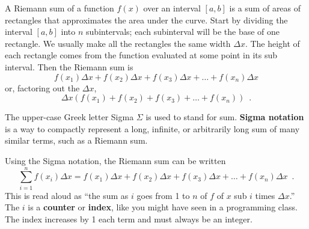 \begin{definition}
A Riemann sum of a function $f(x)$ over an interval $[a,b]$ is a sum of areas of rectangles that approximates the area under the curve. Start by dividing the interval $[a,b]$ into $n$ subintervals; each subinterval will be the base of one rectangle. We usually make all the rectangles the same width $\Delta x$. The height of each rectangle comes from the function evaluated at some point in its sub interval. Then the Riemann sum is
$$f(x_1)\Delta x + f(x_2)\Delta x+f(x_3)\Delta x + \ldots +f(x_n)\Delta x$$
or, factoring out the $\Delta x$,
$$\Delta x(f(x_1)+f(x_2)+f(x_3)+\ldots +f(x_n)) \enspace .$$
\end{definition}
\begin{definition}
The upper-case Greek letter Sigma $\Sigma$ is used to stand for sum. {\bf Sigma notation} is a way to compactly represent a long, infinite, or arbitrarily long sum of many similar terms, such as a Riemann sum.

Using the Sigma notation, the Riemann sum can be written
$$\sum_{i=1}^n f(x_i)\Delta x = f(x_1)\Delta x + f(x_2)\Delta x+f(x_3)\Delta x + \ldots +f(x_n)\Delta x \enspace .$$
This is read aloud as ``the sum as $i$ goes from 1 to $n$ of $f$ of $x$ sub $i$ times $\Delta x$.'' The $i$ is a {\bf counter} or {\bf index}, like you might have seen in a programming class. The index increases by 1 each term and must always be an integer.
\end{definition}

